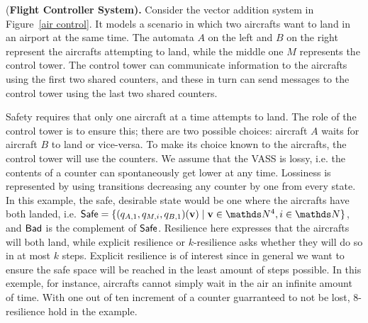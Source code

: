 \begin{example}\label{Example}
{(\bf Flight Controller System).}
Consider the vector addition system in Figure~\ref{air control}. It models a scenario in which two aircrafts want to land in an airport at the same time. 
The automata $A$ on the left and $B$ on the right represent the aircrafts attempting to land, while the middle one $M$ represents the control tower. The control tower can communicate information to the aircrafts using 
the first two shared counters, and these in turn can send messages to the control tower
using the last two shared counters. 

Safety requires that only one aircraft at a time attempts to land. The role of the control tower is to ensure this;
there are two possible choices: aircraft $A$ waits for aircraft $B$ to land
or vice-versa. To make its choice known to the aircrafts, the control tower will use the counters. 
We assume that the VASS is
lossy, i.e. 
 the contents of a counter can spontaneously get lower at any time.
 Lossiness is represented by using transitions decreasing any counter by one from every state. 
In this example, the safe, desirable state would be one where the aircrafts have both landed, i.e.
$\Safe = \{(q_{A,1}, q_{M,i}, q_{B,1})(\textbf{v}) \mid \textbf{v} \in \N^4, i \in \N\}$, and $\textsf{Bad}$ is the complement of $\textsf{Safe}$. 
Resilience here expresses that the aircrafts will both land, while explicit resilience or $k$-resilience asks whether they will do so in at most $k$ steps. 
Explicit resilience is of interest since in general we want to ensure the safe space will
be reached in
the least amount of steps possible. 
In this exemple, for instance, aircrafts cannot simply wait in the air an infinite amount of time.
With one out of ten increment of a counter guarranteed to not be lost, $8$-resilience hold in the example.
\end{example}





